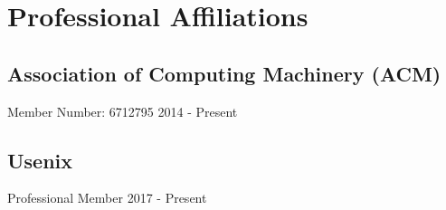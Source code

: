 \documentclass{article}
\begin{document}
    
\section{Professional Affiliations}
  \subsection{Association of Computing Machinery (ACM)}
    Member Number: 6712795 \hfill 2014 - Present
  \subsection{Usenix}
    Professional Member \hfill 2017 - Present
\end{document}
